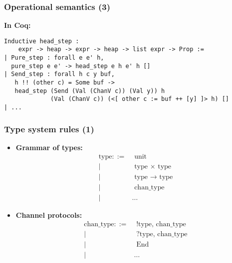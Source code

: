\documentclass[aspectratio=169]{beamer}
\begin{document}
\begin{frame}[fragile]
  \frametitle{Operational semantics (3)}
  \textbf{In Coq:}
  \begin{lstlisting}
Inductive head_step :
    expr -> heap -> expr -> heap -> list expr -> Prop :=
| Pure_step : forall e e' h,
  pure_step e e' -> head_step e h e' h []
| Send_step : forall h c y buf,
   h !! (other c) = Some buf ->
   head_step (Send (Val (ChanV c)) (Val y)) h
             (Val (ChanV c)) (<[ other c := buf ++ [y] ]> h) []
| ...
  \end{lstlisting}
\end{frame}



\begin{frame}[fragile]
  \frametitle{Type system rules (1)}
  \begin{itemize}
    \item \textbf{Grammar of types:}\begin{equation*}
      \begin{split}
      \text{type}  ::= & \text{ unit} \\
        | & \text{ type $\times$ type} \\
        | & \text{ type $\to$ type} \\
        | & \text{ chan\_type } \\
        | & \dots
      \end{split}
      \end{equation*}
  \item \textbf{Channel protocols:}\begin{equation*}
      \begin{split}
      \text{chan\_type}  ::= & \text{ !type, chan\_type} \\
        | & \text{ ?type, chan\_type} \\
        | & \text{ End} \\
        | & \dots
      \end{split}
      \end{equation*}
  \end{itemize}
\end{frame}
\end{document}
